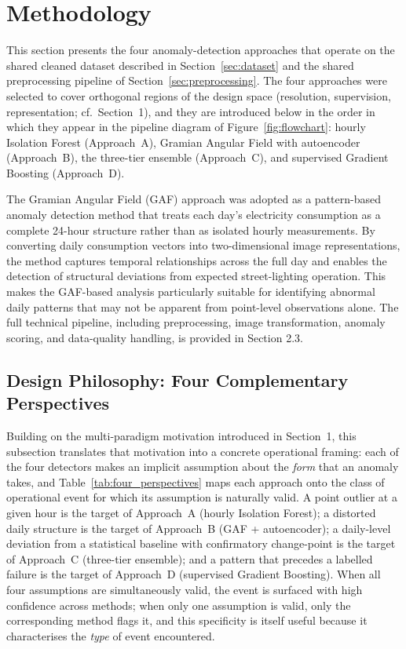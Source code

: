 \documentclass{article}
\begin{document}
\section{Methodology}
This section presents the four anomaly-detection approaches that operate on the shared cleaned dataset described in Section~\ref{sec:dataset} and the shared preprocessing pipeline of Section~\ref{sec:preprocessing}. The four approaches were selected to cover orthogonal regions of the design space (resolution, supervision, representation; cf.\ Section~1), and they are introduced below in the order in which they appear in the pipeline diagram of Figure~\ref{fig:flowchart}: hourly Isolation Forest (Approach~A), Gramian Angular Field with autoencoder (Approach~B), the three-tier ensemble (Approach~C), and supervised Gradient Boosting (Approach~D).

The Gramian Angular Field (GAF) approach was adopted as a pattern-based anomaly detection method that treats each day’s electricity consumption as a complete 24-hour structure rather than as isolated hourly measurements. By converting daily consumption vectors into two-dimensional image representations, the method captures temporal relationships across the full day and enables the detection of structural deviations from expected street-lighting operation. This makes the GAF-based analysis particularly suitable for identifying abnormal daily patterns that may not be apparent from point-level observations alone. The full technical pipeline, including preprocessing, image transformation, anomaly scoring, and data-quality handling, is provided in Section 2.3.


\subsection{Design Philosophy: Four Complementary Perspectives}
\label{subsec:design}

Building on the multi-paradigm motivation introduced in Section~1, this subsection translates that motivation into a concrete operational framing: each of the four detectors makes an implicit assumption about the \emph{form} that an anomaly takes, and Table~\ref{tab:four_perspectives} maps each approach onto the class of operational event for which its assumption is naturally valid. A point outlier at a given hour is the target of Approach~A (hourly Isolation Forest); a distorted daily structure is the target of Approach~B (GAF + autoencoder); a daily-level deviation from a statistical baseline with confirmatory change-point is the target of Approach~C (three-tier ensemble); and a pattern that precedes a labelled failure is the target of Approach~D (supervised Gradient Boosting). When all four assumptions are simultaneously valid, the event is surfaced with high confidence across methods; when only one assumption is valid, only the corresponding method flags it, and this specificity is itself useful because it characterises the \emph{type} of event encountered.
\end{document}
